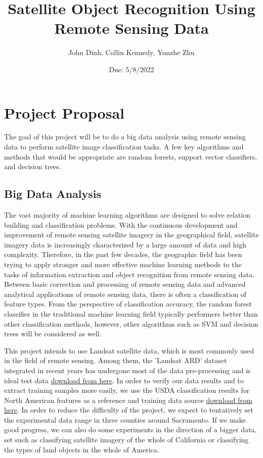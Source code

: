 \documentclass{article}
\title{Satellite Object Recognition Using Remote Sensing Data}
\author{John Dinh, Collin Kennedy, Yunzhe Zhu}
\date{Due: 5/8/2022}
\begin{document}
\maketitle

\section{Project Proposal}

The goal of this project will be to do a big data analysis using remote sensing data to perform satellite image classification tasks. A few key algorithms and methods that would be appropriate are random forests, support vector classifiers, and decision trees.


\subsection{Big Data Analysis}

The vast majority of machine learning algorithms are designed to solve relation building and classification problems. With the continuous development and improvement of remote sensing satellite imagery in the geographical field, satellite imagery data is increasingly characterized by a large amount of data and high complexity. Therefore, in the past few decades, the geographic field has been trying to apply stronger and more effective machine learning methods to the tasks of information extraction and object recognition from remote sensing data. Between basic correction and processing of remote sensing data and advanced analytical applications of remote sensing data, there is often a classification of feature types. From the perspective of classification accuracy, the random forest classifier in the traditional machine learning field typically performers better than other classification methods, however, other algorithms such as SVM and decision trees will be considered as well. 

This project intends to use Landsat satellite data, which is most commonly used in the field of remote sensing. Among them, the 'Landsat ARD' dataset integrated in recent years has undergone most of the data pre-processing and is ideal test data \href{https://earthexplorer.usgs.gov/}{download from here}. In order to verify our data results and to extract training samples more easily, we use the USDA classification results for North American features as a reference and training data source \href{https://nassgeodata.gmu.edu/CropScape/}{download from here}. In order to reduce the difficulty of the project, we expect to tentatively set the experimental data range in three counties around Sacramento. If we make good progress, we can also do some experiments in the direction of a bigger data, set such as classifying satellite imagery of the whole of California or classifying the types of land objects in the whole of America.
\end{document}
